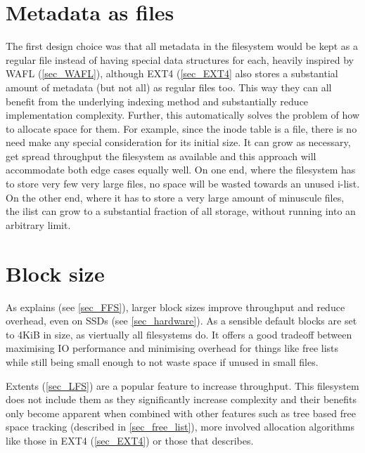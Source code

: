     \section{Metadata as files}
        \label{sec_files}

        The first design choice was that all metadata in the filesystem would
        be kept as a regular file instead of having special data structures for
        each, heavily inspired by WAFL (\ref{sec_WAFL}), although EXT4
        (\ref{sec_EXT4} also stores a substantial amount of metadata (but not
        all) as regular files too. This way they can all benefit from the
        underlying indexing method and substantially reduce implementation
        complexity. Further, this automatically solves the problem of how to
        allocate space for them.  For example, since the inode table is a file,
        there is no need make any special consideration for its initial size.
        It can grow as necessary, get spread throughput the filesystem as
        available and this approach will accommodate both edge cases equally
        well. On one end, where the filesystem has to store very few very large
        files, no space will be wasted towards an unused i-list. On the other
        end, where it has to store a very large amount of minuscule files, the
        ilist can grow to a substantial fraction of all storage, without
        running into an arbitrary limit.

    \section{Block size}
        \label{sec_block_size}

        As \citeauthor{FFS} explains (see \ref{sec_FFS}), larger block sizes
        improve throughput and reduce overhead, even on SSDs (see
        \ref{sec_hardware}). As a sensible default blocks are set to 4KiB in
        size, as viertually all filesystems do. It offers a good tradeoff
        between maximising IO performance and minimising overhead for things
        like free lists while still being small enough to not waste space if
        unused in small files.

        Extents (\ref{sec_LFS}) are a popular feature to increase throughput.
        This filesystem does not include them as they significantly increase
        complexity and their benefits only become apparent when combined with
        other features such as tree based free space tracking (described in
        \ref{sec_free_list}), more involved allocation algorithms like those in
        EXT4 (\ref{sec_EXT4}) or those that \citeauthor{ext4_space_maps}
        describes.

